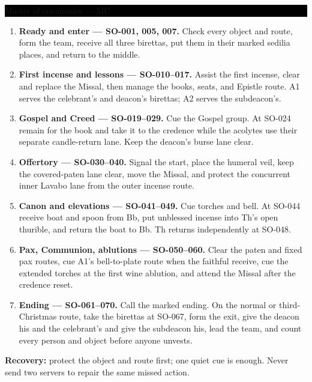 \begingroup
\newcommand{\rolecardstart}{\par\medskip\Needspace{0.27\textheight}}
\renewcommand{\rolecard}[2]{%
  \noindent\colorbox{black}{%
    \parbox{\dimexpr\linewidth-2\fboxsep\relax}{%
      \color{white}\large\bfseries\strut #1}}\par
  \smallskip
  #2\par}

\rolecardstart
{}
\label{solemn-role:mc:first}
\rolecard{Master of ceremonies --- MC}{%
\begin{enumerate}[leftmargin=5.1em,labelwidth=4.4em,labelsep=0.5em,align=left,label=\textbf{Scene \arabic*:}]
\item \textbf{Ready and enter --- SO-001, 005, 007.} Check every object and
route, form the team, receive all three birettas, put them in their marked
sedilia places, and return to the middle.
\item \textbf{First incense and lessons --- SO-010--017.} Assist the first
incense, clear and replace the Missal, then manage the books, seats, and
Epistle route. A1 serves the celebrant's and deacon's birettas; A2 serves the
subdeacon's.
\item \textbf{Gospel and Creed --- SO-019--029.} Cue the Gospel group. At
SO-024 remain for the book and take it to the credence while the acolytes use
their separate candle-return lane. Keep the deacon's burse lane clear.
\item \textbf{Offertory --- SO-030--040.} Signal the start, place the humeral
veil, keep the covered-paten lane clear, move the Missal, and protect the
concurrent inner Lavabo lane from the outer incense route.
\item \textbf{Canon and elevations --- SO-041--049.} Cue torches and bell. At
SO-044 receive boat and spoon from Bb, put unblessed incense into Th's open
thurible, and return the boat to Bb. Th returns independently at SO-048.
\item \textbf{Pax, Communion, ablutions --- SO-050--060.} Clear the paten and
fixed pax routes, cue A1's bell-to-plate route when the faithful receive, cue
the extended torches at the first wine ablution, and attend the Missal after
the credence reset.
\item \textbf{Ending --- SO-061--070.} Call the marked ending. On the normal
or third-Christmas route, take the birettas at SO-067, form the exit, give the
deacon his and the celebrant's and give the subdeacon his, lead the team, and
count every person and object before anyone unvests.
\end{enumerate}

\SolemnEveryRoleTrack

\smallskip
\textbf{Recovery:} protect the object and route first; one quiet cue is
enough. Never send two servers to repair the same missed action.}
\label{solemn-role:mc:last}

